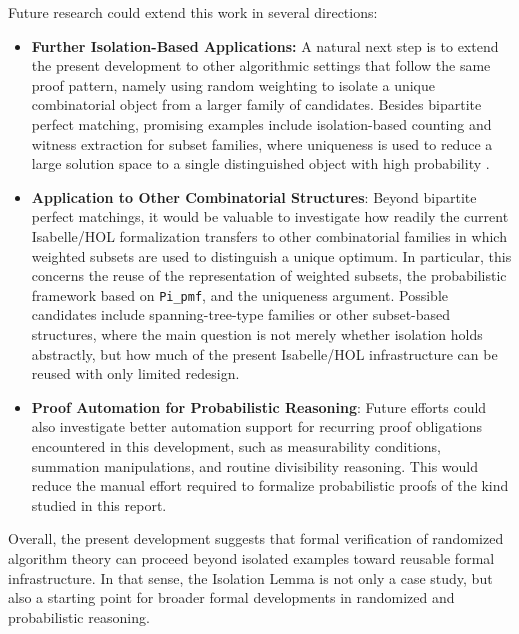 Future research could extend this work in several directions:
\begin{itemize}
    \item \textbf{Further Isolation-Based Applications:}
    A natural next step is to extend the present development to other algorithmic settings that follow the same proof pattern, namely using random weighting to isolate a unique combinatorial object from a larger family of candidates.
    Besides bipartite perfect matching, promising examples include isolation-based counting and witness extraction for subset families, where uniqueness is used to reduce a large solution space to a single distinguished object with high probability \cite{mulmuley1987matching,chari1995isolation}.
    \item \textbf{Application to Other Combinatorial Structures}:
    Beyond bipartite perfect matchings, it would be valuable to investigate how readily the current Isabelle/HOL formalization transfers to other combinatorial families in which weighted subsets are used to distinguish a unique optimum.    
    In particular, this concerns the reuse of the representation of weighted subsets, the probabilistic framework based on \texttt{Pi\_pmf}, and the uniqueness argument.
    Possible candidates include spanning-tree-type families or other subset-based structures, where the main question is not merely whether isolation holds abstractly, but how much of the present Isabelle/HOL infrastructure can be reused with only limited redesign.
    \item \textbf{Proof Automation for Probabilistic Reasoning}:
    Future efforts could also investigate better automation support for recurring proof obligations encountered in this development, such as measurability conditions, summation manipulations, and routine divisibility reasoning.
    This would reduce the manual effort required to formalize probabilistic proofs of the kind studied in this report.
\end{itemize}

Overall, the present development suggests that formal verification of randomized algorithm theory can proceed beyond isolated examples toward reusable formal infrastructure.
In that sense, the Isolation Lemma is not only a case study, but also a starting point for broader formal developments in randomized and probabilistic reasoning.
